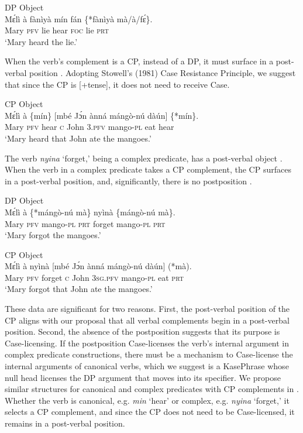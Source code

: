 \documentclass[output=paper,colorlinks,citecolor=brown,draftmode
]{langscibook}
\begin{document}
\begin{samepage}
\ea \label{ex:Kono: CanonicalDPO}
DP Object \\
\gll Mɛ́lì à fànìyà mín fán \{*fànìyà mà/à/fɛ́\}.  \\
Mary \textsc{pfv} lie hear \textsc{foc} \phantom{\{*}lie \textsc{prt} \\
\glt `Mary heard the lie.'
\z
\end{samepage}

When the verb’s complement is a CP, instead of a DP, it must surface in a post-verbal position . Adopting Stowell's (1981) Case Resistance Principle, we suggest that since the CP is [+tense], it does not need to receive Case.


\ea \label{ex:Kono: CanonicalCPO}
CP Object \\
\gll Mɛ́lì à \{mín\} [mbé Jɔ́n ànná mángò-nú dàún] \{*mín\}.  \\
Mary \textsc{pfv} hear  \textsc{c} John \textsc{3.pfv} mango-\textsc{pl} eat hear \\
\glt `Mary heard that John ate the mangoes.'
\z

The verb \textit{nyina} ‘forget,’ being a complex predicate, has a post-verbal object . When the verb in a complex predicate takes a CP complement, the CP surfaces in a post-verbal position, and, significantly, there is no postposition  . 


\ea \label{ex:Kono: ComplexDPO}
DP Object \\
\gll Mɛ́lì à \{*mángò-nú 	mà\} nyìnà  \{mángò-nú 	mà\}.	 \\
Mary \textsc{pfv} mango-\textsc{pl} \textsc{prt} forget mango-\textsc{pl} \textsc{prt} \\
\glt `Mary forgot the mangoes.'
\z


\ea \label{ex:Kono: ComplexCPO}
CP Object \\
\gll Mɛ́lì à nyìnà [mbé Jɔ́n ànná mángò-nú dàún] (*mà). \\
Mary \textsc{pfv} forget \textsc{c} John \textsc{3sg.pfv} mango-\textsc{pl} eat \textsc{prt} \\
\glt `Mary forgot that John ate the mangoes.'
\z

These data are significant for two reasons. First, the post-verbal position of the CP aligns with our proposal that all verbal complements begin in a post-verbal position. Second, the absence of the postposition suggests that its purpose is Case-licensing. If the postposition Case-licenses the verb’s internal argument in complex predicate constructions, there must be a mechanism to Case-license the internal arguments of canonical verbs, which we suggest is a KasePhrase whose null head licenses the DP argument that moves into its specifier.
We propose similar structures for canonical and complex predicates with CP complements in . Whether the verb is canonical, e.g. \textit{min} ‘hear’ or complex, e.g. \textit{nyina} ‘forget,’ it selects a CP complement, and since the CP does not need to be Case-licensed, it remains in a post-verbal position.  
\end{document}
